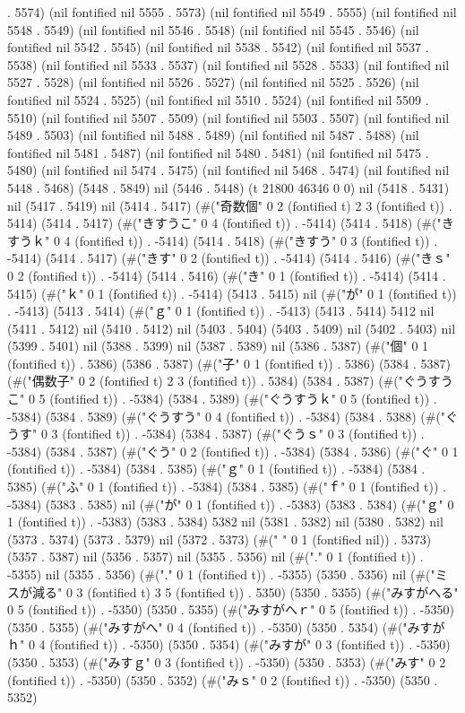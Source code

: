 {. 5574) (nil fontified nil 5555 . 5573) (nil fontified nil 5549 . 5555) (nil fontified nil 5548 . 5549) (nil fontified nil 5546 . 5548) (nil fontified nil 5545 . 5546) (nil fontified nil 5542 . 5545) (nil fontified nil 5538 . 5542) (nil fontified nil 5537 . 5538) (nil fontified nil 5533 . 5537) (nil fontified nil 5528 . 5533) (nil fontified nil 5527 . 5528) (nil fontified nil 5526 . 5527) (nil fontified nil 5525 . 5526) (nil fontified nil 5524 . 5525) (nil fontified nil 5510 . 5524) (nil fontified nil 5509 . 5510) (nil fontified nil 5507 . 5509) (nil fontified nil 5503 . 5507) (nil fontified nil 5489 . 5503) (nil fontified nil 5488 . 5489) (nil fontified nil 5487 . 5488) (nil fontified nil 5481 . 5487) (nil fontified nil 5480 . 5481) (nil fontified nil 5475 . 5480) (nil fontified nil 5474 . 5475) (nil fontified nil 5468 . 5474) (nil fontified nil 5448 . 5468) (5448 . 5849) nil (5446 . 5448) (t 21800 46346 0 0) nil (5418 . 5431) nil (5417 . 5419) nil (5414 . 5417) (#("奇数個" 0 2 (fontified t) 2 3 (fontified t)) . 5414) (5414 . 5417) (#("きすうこ" 0 4 (fontified t)) . -5414) (5414 . 5418) (#("きすうｋ" 0 4 (fontified t)) . -5414) (5414 . 5418) (#("きすう" 0 3 (fontified t)) . -5414) (5414 . 5417) (#("きす" 0 2 (fontified t)) . -5414) (5414 . 5416) (#("きｓ" 0 2 (fontified t)) . -5414) (5414 . 5416) (#("き" 0 1 (fontified t)) . -5414) (5414 . 5415) (#("ｋ" 0 1 (fontified t)) . -5414) (5413 . 5415) nil (#("が" 0 1 (fontified t)) . -5413) (5413 . 5414) (#("ｇ" 0 1 (fontified t)) . -5413) (5413 . 5414) 5412 nil (5411 . 5412) nil (5410 . 5412) nil (5403 . 5404) (5403 . 5409) nil (5402 . 5403) nil (5399 . 5401) nil (5388 . 5399) nil (5387 . 5389) nil (5386 . 5387) (#("個" 0 1 (fontified t)) . 5386) (5386 . 5387) (#("子" 0 1 (fontified t)) . 5386) (5384 . 5387) (#("偶数子" 0 2 (fontified t) 2 3 (fontified t)) . 5384) (5384 . 5387) (#("ぐうすうこ" 0 5 (fontified t)) . -5384) (5384 . 5389) (#("ぐうすうｋ" 0 5 (fontified t)) . -5384) (5384 . 5389) (#("ぐうすう" 0 4 (fontified t)) . -5384) (5384 . 5388) (#("ぐうす" 0 3 (fontified t)) . -5384) (5384 . 5387) (#("ぐうｓ" 0 3 (fontified t)) . -5384) (5384 . 5387) (#("ぐう" 0 2 (fontified t)) . -5384) (5384 . 5386) (#("ぐ" 0 1 (fontified t)) . -5384) (5384 . 5385) (#("ｇ" 0 1 (fontified t)) . -5384) (5384 . 5385) (#("ふ" 0 1 (fontified t)) . -5384) (5384 . 5385) (#("ｆ" 0 1 (fontified t)) . -5384) (5383 . 5385) nil (#("が" 0 1 (fontified t)) . -5383) (5383 . 5384) (#("ｇ" 0 1 (fontified t)) . -5383) (5383 . 5384) 5382 nil (5381 . 5382) nil (5380 . 5382) nil (5373 . 5374) (5373 . 5379) nil (5372 . 5373) (#(" " 0 1 (fontified nil)) . 5373) (5357 . 5387) nil (5356 . 5357) nil (5355 . 5356) nil (#("." 0 1 (fontified t)) . -5355) nil (5355 . 5356) (#("." 0 1 (fontified t)) . -5355) (5350 . 5356) nil (#("ミスが減る" 0 3 (fontified t) 3 5 (fontified t)) . 5350) (5350 . 5355) (#("みすがへる" 0 5 (fontified t)) . -5350) (5350 . 5355) (#("みすがへｒ" 0 5 (fontified t)) . -5350) (5350 . 5355) (#("みすがへ" 0 4 (fontified t)) . -5350) (5350 . 5354) (#("みすがｈ" 0 4 (fontified t)) . -5350) (5350 . 5354) (#("みすが" 0 3 (fontified t)) . -5350) (5350 . 5353) (#("みすｇ" 0 3 (fontified t)) . -5350) (5350 . 5353) (#("みす" 0 2 (fontified t)) . -5350) (5350 . 5352) (#("みｓ" 0 2 (fontified t)) . -5350) (5350 . 5352) }
